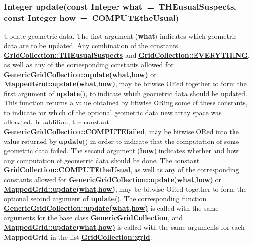 \documentclass{article}
\begin{document}
  \subsubsection{Integer update(const Integer what~=~THEusualSuspects, const Integer how~=~COMPUTEtheUsual)}
  \label{GridCollection::update(what,how)}
    Update geometric data.
    The first argument (\textbf{what}) indicates which geometric data are to be updated.  Any combination of the constants
    {\bf{}\hyperref{THEusualSuspects}{THEusualSuspects \rm(\S}{)}{GridCollection::THEusualSuspects}} and
    {\bf{}\hyperref{EVERYTHING}{EVERYTHING \rm(\S}{)}{GridCollection::EVERYTHING}},
    as well as any of the corresponding constants allowed for
    {\bf{}\hyperref{GenericGridCollection::update(what,how)}{GenericGridCollection::update(what,how) \rm(\S}{)}{GenericGridCollection::update(what,how)}} or
    {\bf{}\hyperref{MappedGrid::update(what,how)}{MappedGrid::update(what,how) \rm(\S}{)}{MappedGrid::update(what,how)}},
    may be bitwise ORed together to form the first argument of \textbf{update}(),
    to indicate which geometric data should be updated.
    This function returns a value obtained by bitwise ORing some of these constants,
    to indicate for which of the optional geometric data new array space was allocated.
    In addition, the constant
    {\bf{}\hyperref{COMPUTEfailed}{COMPUTEfailed \rm(\S}{)}{GenericGridCollection::COMPUTEfailed}},
    may be bitwise ORed into the value returned by \textbf{update}() in order to indicate
    that the computation of some geometric data failed.  The second argument (\textbf{how})
    indicates whether and how any computation of geometric data should be done.
    The constant {\bf{}\hyperref{COMPUTEtheUsual}{COMPUTEtheUsual \rm(\S}{)}{GridCollection::COMPUTEtheUsual}},
    as well as any of the corresponding constants allowed for
    {\bf{}\hyperref{GenericGridCollection::update(what,how)}{GenericGridCollection::update(what,how) \rm(\S}{)}{GenericGridCollection::update(what,how)}} or
    {\bf{}\hyperref{MappedGrid::update(what,how)}{MappedGrid::update(what,how) \rm(\S}{)}{MappedGrid::update(what,how)}},
    may be bitwise ORed together to form the optional second argument of \textbf{update}().
    The corresponding function
    {\bf{}\hyperref{update(what,how)}{update(what,how) \rm(\S}{)}{GenericGridCollection::update(what,how)}}
    is called with the same arguments for the base class \textbf{GenericGridCollection}, and
    {\bf{}\hyperref{update(what,how)}{update(what,how) \rm(\S}{)}{MappedGrid::update(what,how)}}
    is called with the same arguments for each \textbf{MappedGrid} in the list
    {\bf{}\hyperref{grid}{grid \rm(\S}{)}{GridCollection::grid}}.
\end{document}
